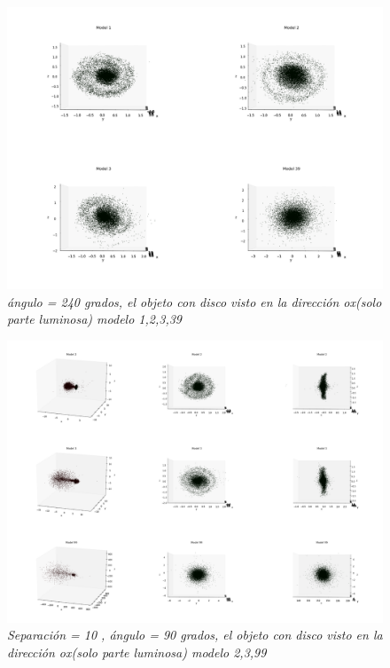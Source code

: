 \documentclass[12pt]{article} %
\renewcommand{\=}[1]{\stackrel{#1}{=}} %
\theoremstyle{definition}
\theoremstyle{remark}
\begin{document}
\begin{figure}[!ht]
 \centering
 \includegraphics[scale=0.2]{240deg-m-c2.png}
 \caption{\emph{ ángulo = 240 grados, el objeto con disco visto en la dirección ox(solo parte luminosa) modelo 1,2,3,39 }}
\end{figure}




\begin{figure}[!ht]
 \centering
 \includegraphics[scale=0.2]{sep10.png}
 \caption{\emph{ Separación = 10 , ángulo = 90 grados, el objeto con disco visto en la dirección ox(solo parte luminosa) modelo 2,3,99 }}
\end{figure}
\end{document}
